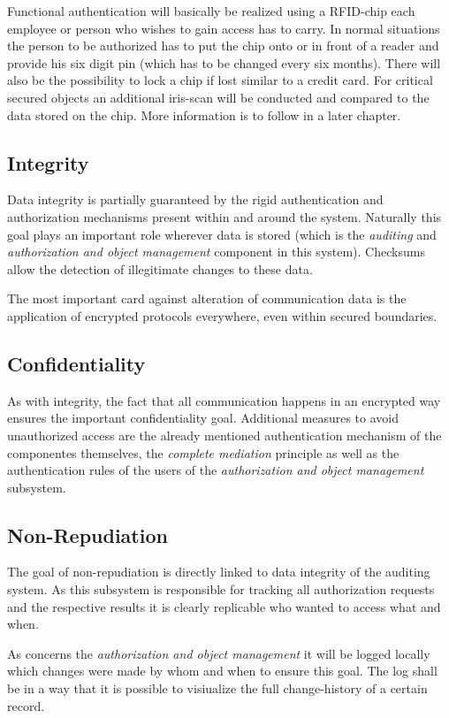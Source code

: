 \documentclass[12pt,a4paper,titlepage,oneside]{scrartcl}
\begin{document}
Functional authentication will basically be realized using a RFID-chip each employee or person who wishes to gain access has to carry.
In normal situations the person to be authorized has to put the chip onto or in front of a reader and provide his six digit pin
(which has to be changed every six months). There will also be the possibility to lock a chip if lost similar to a credit card.
For critical secured objects an additional iris-scan will be conducted and compared to the data stored on the chip.
More information is to follow in a later chapter.


\subsection{Integrity}
Data integrity is partially guaranteed by the rigid authentication and authorization mechanisms present within and around the system.
Naturally this goal plays an important role wherever data is stored (which is the \emph{auditing} and \emph{authorization and object management}
component in this system). Checksums allow the detection of illegitimate changes to these data.

The most important card against alteration of communication data is the application of encrypted protocols everywhere, even within
secured boundaries.


\subsection{Confidentiality}
As with integrity, the fact that all communication happens in an encrypted way ensures the important confidentiality goal. Additional
measures to avoid unauthorized access are the already mentioned authentication mechanism of the componentes themselves, the
\emph{complete mediation} principle as well as the authentication rules of the users of the \emph{authorization and object management}
subsystem.


\subsection{Non-Repudiation}
The goal of non-repudiation is directly linked to data integrity of the auditing system. As this subsystem is responsible for tracking
all authorization requests and the respective results it is clearly replicable who wanted to access what and when.

As concerns the \emph{authorization and object management} it will be logged locally which changes were made by whom and when to ensure
this goal. The log shall be in a way that it is possible to visiualize the full change-history of a certain record.
\end{document}
